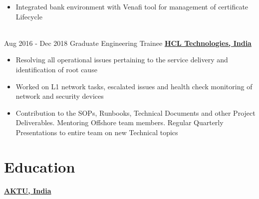 \documentclass[letterpaper]{twentysecondcv} %
\begin{document}
\begin{twenty}
{{\begin{itemize}
                    \item Integrated bank environment with Venafi tool for management of certificate Lifecycle
                \end{itemize}}
                }
            \\
            \twentyitem
           		{Aug 2016 -}
        		{Dec 2018}
                {Graduate Engineering Trainee}
                {\textbf{\href{https://www.hcltech.com/}{ HCL Technologies, India}}}
                {}
                {
                {\begin{itemize}
                    \item Resolving all operational issues pertaining to the service delivery and identification of root cause 
                    \item Worked on L1 network tasks, escalated issues and health check monitoring of network and security devices
                    \item Contribution to the SOPs, Runbooks, Technical Documents and other Project Deliverables. Mentoring Offshore team members. Regular Quarterly Presentations to entire team on new Technical topics
            \end{itemize}}
                }
        \end{twenty}
        \vspace{-4mm}
        
        \vspace{-4mm}
        \section*{{\color{pblue}\LARGE Education}}
        \vspace{-2mm}
        {}\hspace{2em} {\small{\textbf{\href{https://aktu.ac.in/}{AKTU, India}}}}
        \vspace{-7mm}
\end{document}
